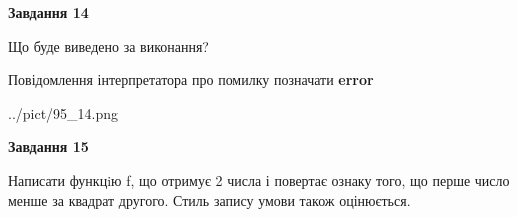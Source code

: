 \documentclass[11pt, ukrainian]{article}
\begin{document}
{\begin {large}
{\begin {center}\textbf{Завдання 14}\end {center}}\par
Що буде виведено за виконання? \par
Повідомлення інтерпретатора про помилку позначати \textbf{error}

\begin{center}
	{../pict/95_14.png}
\end{center}
\newpage

{\begin {center}\textbf{Завдання 15}\end {center}}\par

Написати функцiю f, що отримує 2 числа і повертає ознаку того, що перше число менше за квадрат другого. Стиль запису умови також оцінюється.\par
\newpage

\end {large}}
\end{document}
